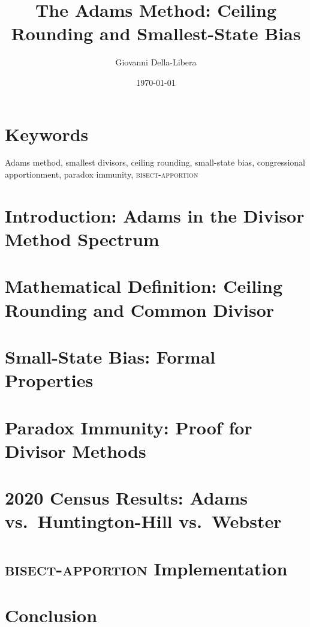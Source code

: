 \documentclass[12pt]{article}
\title{\textbf{The Adams Method: Ceiling Rounding and Smallest-State Bias}}
\author{Giovanni Della-Libera}
\date{\today}
\begin{document}
\maketitle

\begin{abstract}

\end{abstract}

\section*{Keywords}
Adams method, smallest divisors, ceiling rounding, small-state bias,
congressional apportionment, paradox immunity, \textsc{bisect-apportion}

\section{Introduction: Adams in the Divisor Method Spectrum}


\section{Mathematical Definition: Ceiling Rounding and Common Divisor}


\section{Small-State Bias: Formal Properties}


\section{Paradox Immunity: Proof for Divisor Methods}


\section{2020 Census Results: Adams vs.\ Huntington-Hill vs.\ Webster}


\section{\textsc{bisect-apportion} Implementation}


\section{Conclusion}




\end{document}
